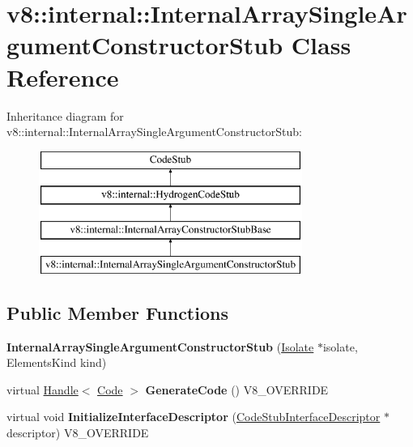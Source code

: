 \hypertarget{classv8_1_1internal_1_1_internal_array_single_argument_constructor_stub}{}\section{v8\+:\+:internal\+:\+:Internal\+Array\+Single\+Argument\+Constructor\+Stub Class Reference}
\label{classv8_1_1internal_1_1_internal_array_single_argument_constructor_stub}
Inheritance diagram for v8\+:\+:internal\+:\+:Internal\+Array\+Single\+Argument\+Constructor\+Stub\+:\begin{figure}[H]
\begin{center}
\leavevmode
\includegraphics[height=4.000000cm]{classv8_1_1internal_1_1_internal_array_single_argument_constructor_stub}
\end{center}
\end{figure}
\subsection*{Public Member Functions}
\begin{DoxyCompactItemize}
\item 
\hypertarget{classv8_1_1internal_1_1_internal_array_single_argument_constructor_stub_acc7d7a17af98dfff458a10265d9e8c0e}{}{\bfseries Internal\+Array\+Single\+Argument\+Constructor\+Stub} (\hyperlink{classv8_1_1internal_1_1_isolate}{Isolate} $\ast$isolate, Elements\+Kind kind)\label{classv8_1_1internal_1_1_internal_array_single_argument_constructor_stub_acc7d7a17af98dfff458a10265d9e8c0e}

\item 
\hypertarget{classv8_1_1internal_1_1_internal_array_single_argument_constructor_stub_ac52162fc0e1f8c3a650ed2c53e92a463}{}virtual \hyperlink{classv8_1_1internal_1_1_handle}{Handle}$<$ \hyperlink{classv8_1_1internal_1_1_code}{Code} $>$ {\bfseries Generate\+Code} () V8\+\_\+\+O\+V\+E\+R\+R\+I\+D\+E\label{classv8_1_1internal_1_1_internal_array_single_argument_constructor_stub_ac52162fc0e1f8c3a650ed2c53e92a463}

\item 
\hypertarget{classv8_1_1internal_1_1_internal_array_single_argument_constructor_stub_a98a8f5cfd89e04cf00e92a9a223bd658}{}virtual void {\bfseries Initialize\+Interface\+Descriptor} (\hyperlink{classv8_1_1internal_1_1_code_stub_interface_descriptor}{Code\+Stub\+Interface\+Descriptor} $\ast$descriptor) V8\+\_\+\+O\+V\+E\+R\+R\+I\+D\+E\label{classv8_1_1internal_1_1_internal_array_single_argument_constructor_stub_a98a8f5cfd89e04cf00e92a9a223bd658}

\end{DoxyCompactItemize}
